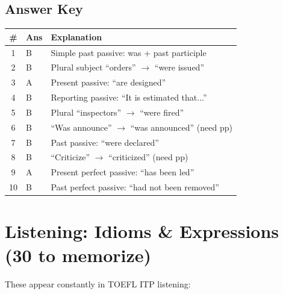 \documentclass[10pt,a4paper]{article}
\begin{document}
\subsection*{Answer Key}

\begin{center}
\begin{tabular}{cll}
\toprule
\# & Ans & Explanation \\
\midrule
1 & B & Simple past passive: was + past participle \\
2 & B & Plural subject ``orders'' $\to$ ``were issued'' \\
3 & A & Present passive: ``are designed'' \\
4 & B & Reporting passive: ``It is estimated that...'' \\
5 & B & Plural ``inspectors'' $\to$ ``were fired'' \\
6 & B & ``Was announce'' $\to$ ``was announced'' (need pp) \\
7 & B & Past passive: ``were declared'' \\
8 & B & ``Criticize'' $\to$ ``criticized'' (need pp) \\
9 & A & Present perfect passive: ``has been led'' \\
10 & B & Past perfect passive: ``had not been removed'' \\
\bottomrule
\end{tabular}
\end{center}

\section*{Listening: Idioms \& Expressions (30 to memorize)}

These appear constantly in TOEFL ITP listening:
\end{document}
